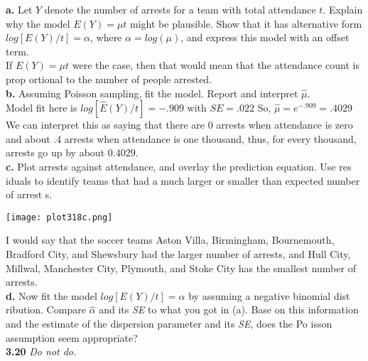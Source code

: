 \documentclass[paper=letter, fontsize=11pt]{scrartcl} %
\begin{document}
\textbf{a.} Let $Y$ denote the number of arrests for a team with total attendance $t$. 
Explain why the model $E(Y) = \mu t$ might be plausible. Show that it has alternative form 
$log[E(Y)/t] = \alpha$, where $\alpha = log(\mu)$, and express this model with an offset 
term. \\

If $E(Y) = \mu t$ were the case, then that would mean that the attendance count is prop
ortional to the number of people arrested. \\ 

\textbf{b.} Assuming Poisson sampling, fit the model. Report and interpret $\hat{\mu}$.\\

Model fit here is $log[\hat{E}(Y)/t] = -.909$ with $SE = .022$ So, $\hat{\mu} = e^{-.909}
= .4029$ We can interpret this as saying that there are 0 arrests when attendance is zero
and about .4 arrests when attendance is one thousand, thus, for every thousand, arrests
 go up by about $0.4029$. \\

\textbf{c.} Plot arrests against attendance, and overlay the prediction equation. Use res
iduals to identify teams that had a much larger or smaller than expected number of arrest
s. \\

\begin{center}
    \texttt{[image: plot318c.png]}
\end{center}

I would say that the soccer teams Aston Villa, Birmingham, Bournemouth, Bradford City, 
and Shewsbury had the larger number of arrests, and Hull City, Millwal, Manchester City,
 Plymouth, and Stoke City has the smallest number of arrests. \\

\textbf{d.} Now fit the model $log[E(Y)/t] = \alpha$ by assuming a negative binomial dist
ribution. Compare $\hat{\alpha}$ and its \textit{SE} to what you got in (a). Base on this 
information and the estimate of the dispersion parameter and its \textit{SE}, does the Po
isson assumption seem appropriate? \\

\textbf{3.20} \textit{Do not do.}
\end{document}
